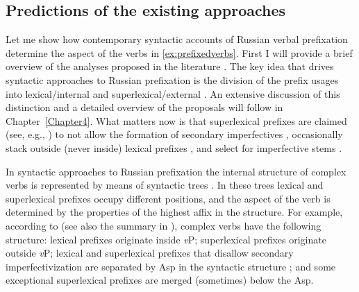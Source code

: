 \subsection{Predictions of the existing approaches}\label{subsection:bi:predictions}
Let me show how contemporary syntactic accounts of  Russian verbal prefixation  determine the aspect  of the verbs in \ref{ex:prefixedverbs}. First I will provide a brief overview of the analyses proposed in the literature \citep{Ramchand:04, Svenonius:04a, Svenonius:04b, Romanova:06, Tatevosov:07, Tatevosov:09}. The key idea that drives syntactic approaches to Russian prefixation  is the division of the prefix usages into lexical/internal  and superlexical/external . An extensive discussion of this distinction and a detailed overview of the proposals will follow in Chapter~\ref{Chapter4}. What matters now is that superlexical prefixes  are claimed (see, e.g., \citealt[229]{Svenonius:04b}) to not allow the formation of secondary imperfectives , occasionally stack outside (never inside) lexical prefixes , and select for imperfective stems .

In syntactic approaches to Russian prefixation  the internal structure of complex verbs  is represented by means of syntactic trees . In these trees lexical and superlexical prefixes  occupy different positions, and the aspect of the verb is determined by the properties of the highest affix in the structure. For example, according to \citealt{Svenonius:04b} (see also the summary in \citealt{Svenonius:12}), complex verbs  have the following structure: lexical prefixes  originate inside \textit{v}P; superlexical prefixes  originate outside \textit{v}P; lexical and superlexical prefixes  that disallow secondary imperfectivization  are separated by Asp in the syntactic structure ; and some exceptional superlexical prefixes  are merged (sometimes) below the Asp.

